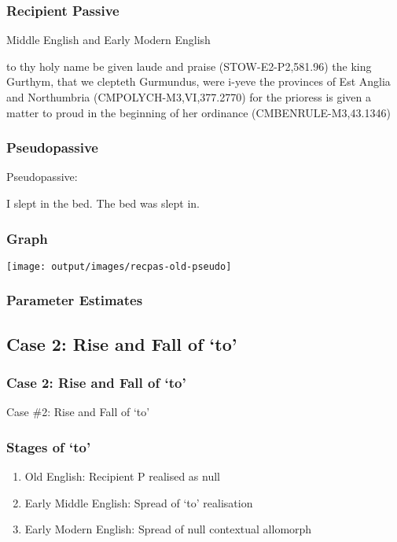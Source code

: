 \documentclass{beamer}
\begin{document}
\begin{frame}
	\frametitle{Recipient Passive}
	\begin{exe}
		\ex Middle English \citep{Kroch.2000} and Early Modern English \citep{Kroch.2004}
		\begin{xlist}
			\ex\label{ex:obliq-to-rec-eng} to thy holy name be given laude and praise (STOW-E2-P2,581.96)
			\ex\label{ex:obliq-rec-eng} the king Gurthym, that we clepteth Gurmundus, were i-yeve the provinces of Est Anglia and Northumbria (CMPOLYCH-M3,VI,377.2770)
			\ex\label{ex:nom-rec-eng} for the prioress is given a matter to proud in the beginning of her ordinance (CMBENRULE-M3,43.1346)
		\end{xlist}
	\end{exe}
\end{frame}

\begin{frame}
	\frametitle{Pseudopassive}
	\begin{exe}
		\ex Pseudopassive:
		\begin{xlist}
			\ex I slept in the bed.
			\ex The bed was slept in.
		\end{xlist}
	\end{exe}
\end{frame}

\begin{frame}
	\frametitle{Graph}
	\texttt{[image: output/images/recpas-old-pseudo]}
\end{frame}

\begin{frame}
	\frametitle{Parameter Estimates}
	
\end{frame}

\subsection{Case 2: Rise and Fall of `to'}
\begin{frame}
	\frametitle{Case 2: Rise and Fall of `to'}
	\vfill
	\Large
	Case \#2: Rise and Fall of `to'
	\vfill
\end{frame}
\begin{frame}
	\frametitle{Stages of `to'}
	\begin{enumerate}
		\item Old English: Recipient P realised as null 
		\item Early Middle English: Spread of `to' realisation
		\item Early Modern English: Spread of null contextual allomorph
	\end{enumerate}
\end{frame}
\end{document}
